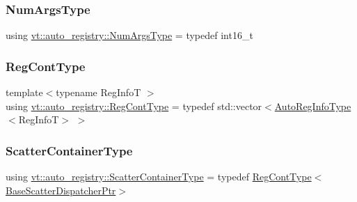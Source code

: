 \mbox{\label{namespacevt_1_1auto__registry_aebda1d9d765bc9147dc654ad0712c936}} 
\subsubsection{\texorpdfstring{Num\+Args\+Type}{NumArgsType}}
{\footnotesize\ttfamily using \hyperlink{namespacevt_1_1auto__registry_aebda1d9d765bc9147dc654ad0712c936}{vt\+::auto\+\_\+registry\+::\+Num\+Args\+Type} = typedef int16\+\_\+t}

\mbox{\label{namespacevt_1_1auto__registry_a988a4943e4c8fe82b56f5b13bddceb2b}} 
\subsubsection{\texorpdfstring{Reg\+Cont\+Type}{RegContType}}
{\footnotesize\ttfamily template$<$typename Reg\+InfoT $>$ \\
using \hyperlink{namespacevt_1_1auto__registry_a988a4943e4c8fe82b56f5b13bddceb2b}{vt\+::auto\+\_\+registry\+::\+Reg\+Cont\+Type} = typedef std\+::vector$<$\hyperlink{namespacevt_1_1auto__registry_af3f78826dd69454aeb914a3c7bec0a52}{Auto\+Reg\+Info\+Type}$<$Reg\+InfoT$>$ $>$}

\mbox{\label{namespacevt_1_1auto__registry_a0f315fdd34135b6a311be7225157bb6b}} 
\subsubsection{\texorpdfstring{Scatter\+Container\+Type}{ScatterContainerType}}
{\footnotesize\ttfamily using \hyperlink{namespacevt_1_1auto__registry_a0f315fdd34135b6a311be7225157bb6b}{vt\+::auto\+\_\+registry\+::\+Scatter\+Container\+Type} = typedef \hyperlink{namespacevt_1_1auto__registry_a988a4943e4c8fe82b56f5b13bddceb2b}{Reg\+Cont\+Type}$<$\hyperlink{namespacevt_1_1auto__registry_aba7be4c573c0f1361c024e4d3293a62a}{Base\+Scatter\+Dispatcher\+Ptr}$>$}



